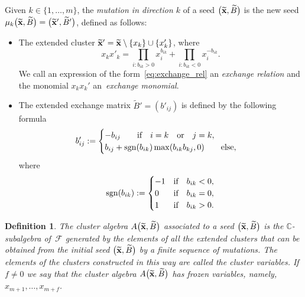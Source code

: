 \documentclass[10pt,a4paper]{amsart}
\newtheorem{Definition}[Theorem]{Definition}
\numberwithin{equation}{section}
\begin{document}
Given $k\in \{1, \dots , m \}$, the {\it mutation in direction $k$} of a seed $\big(\widetilde{{\bf x}}, \widetilde{B}\big)$ is the new seed $\mu_k\big(\widetilde{{\bf x}}, \widetilde{B}\big)=\big(\widetilde{{\bf x}}', \widetilde{B}'\big)$, defined as follows:
\begin{itemize}\itemsep=0pt
 \item The extended cluster $\widetilde{{\bf x}}'=\widetilde{{\bf x}}\setminus\{ x_k \} \cup \{ x'_k \} $, where
 \begin{equation}
 \label{eq:exchange_rel}
 x_k x'_k= \prod_{i\colon b_{ik}>0}x^{b_{ik}}_i + \prod_{i\colon b_{ik}<0}x^{-b_{ik}}_i.
 \end{equation}
 We call an expression of the form~\eqref{eq:exchange_rel} an {\it exchange relation} and the monomial $x_kx_k'$ an~{\it exchange monomial}.
 \item The extended exchange matrix $\widetilde{B}'=(b'_{ij})$ is defined by the following formula
 \begin{displaymath}%
 b'_{ij}:= \begin{cases} -b_{ij} \qquad\text{if}\quad i=k\quad \text{or}\quad j=k,\\
 b_{ij} +\mathop{\rm sgn}(b_{ik})\mathop{\rm max}(b_{ik}b_{kj},0) \qquad\text{else},
 \end{cases}
 \end{displaymath}
 where
\[
\mathop{\rm sgn}(b_{ik}):= \begin{cases}
-1 &\text{if}\quad b_{ik}<0,\\
0 &\text{if}\quad b_{ik}=0,\\
1 &\text{if}\quad b_{ik}>0.\end{cases}
\]
\end{itemize}

\begin{Definition}\label{def:cluster algebra}
The {\it cluster algebra} $A\big(\widetilde{{\bf x}},\widetilde{B}\big)$ associated to a seed $\big(\widetilde{{\bf x}},\widetilde{B}\big) $ is the $\mathbb C$-subalgebra of~$\mathcal F$ generated by the elements of \emph{all} the extended clusters that can be obtained from the {\it initial seed} $\big(\widetilde{{\bf x}},\widetilde{B}\big)$ by a finite sequence of mutations.
The elements of the clusters constructed in this way are called the {\it cluster variables}. If $f\neq 0$ we say that the cluster algebra $A\big(\widetilde{{\bf x}},\widetilde{B}\big)$ has frozen variables, namely, $x_{m+1}, \dots , x_{m+f}$.
\end{Definition}
\end{document}
